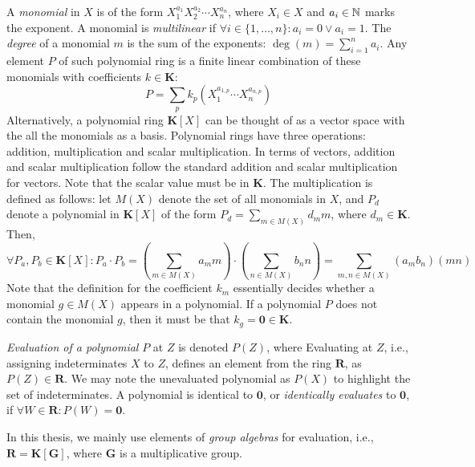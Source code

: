 A \emph{monomial} in $X$ is of the form 
$X_1^{a_1}X_2^{a_2}\cdots X_n^{a_n}$, where $X_i \in X$ and $a_i \in \mathbb N$ marks the exponent. 
A monomial is \emph{multilinear} if 
$\forall i \in \{1, \ldots, n\} \colon a_i = 0 \vee a_i = 1$. 
The \emph{degree} of a monomial $m$ 
is the sum of the exponents: $\deg(m) = \sum_{i=1}^n a_i$. 
Any element $P$ of such polynomial ring is a finite linear combination of these monomials 
with coefficients $k \in \mathbf{K}$: 
\[
  P = \displaystyle \sum_p k_p(X_1^{a_{1,p}} \cdots X_n^{a_{n,p}})
\] 
Alternatively, a polynomial ring $\mathbf{K}[X]$ can be thought of as a vector
space
with 
the  all the monomials as a basis. 
Polynomial rings have three operations: addition, multiplication 
and scalar multiplication. In terms of vectors, addition and scalar multiplication follow 
the standard addition and scalar multiplication for vectors. 
Note that the scalar value must be in $\mathbf{K}$. 
The multiplication is defined as follows: 
let $M(X)$ denote the set of all monomials in $X$, and 
$P_d$ denote a polynomial in $\mathbf{K}[X]$ of the form $P_d = \sum_{m \in M(X)} d_m m$, 
where $d_m \in \mathbf{K}$. Then, 
\[
  \forall P_a,P_b \in \mathbf{K}[X] \colon P_a \cdot P_b = (\displaystyle \sum_{m \in M(X)} a_m m)
  \cdot (\displaystyle \sum_{n \in M(X)} b_n n) = \displaystyle \sum_{m,n \in M(X)} (a_mb_n) (mn)
\]
Note that the definition for the coefficient $k_m$ essentially 
decides whether a monomial $g \in M(X)$ appears in a polynomial. If a polynomial $P$ 
does not contain the monomial $g$, then it must be that $k_g = \mathbf{0} \in \mathbf{K}$.

\emph{Evaluation of a polynomial} $P$ at $Z$ is denoted $P(Z)$, where 
Evaluating at $Z$, i.e., assigning indeterminates $X$ to $Z$, defines an 
element from the ring $\mathbf{R}$, as $P(Z) \in \mathbf{R}$. We may note the unevaluated 
polynomial as $P(X)$ to highlight the set of indeterminates. 
A polynomial is identical to $\mathbf{0}$, or \emph{identically 
evaluates} to $\mathbf{0}$, if $\forall W \in \mathbf{R} \colon P(W) = \mathbf{0}$.

In this thesis, we mainly use elements of \emph{group algebras} 
for evaluation, i.e., $\mathbf{R} = \mathbf{K}[\mathbf{G}]$, where $\mathbf{G}$ is a 
multiplicative group.

